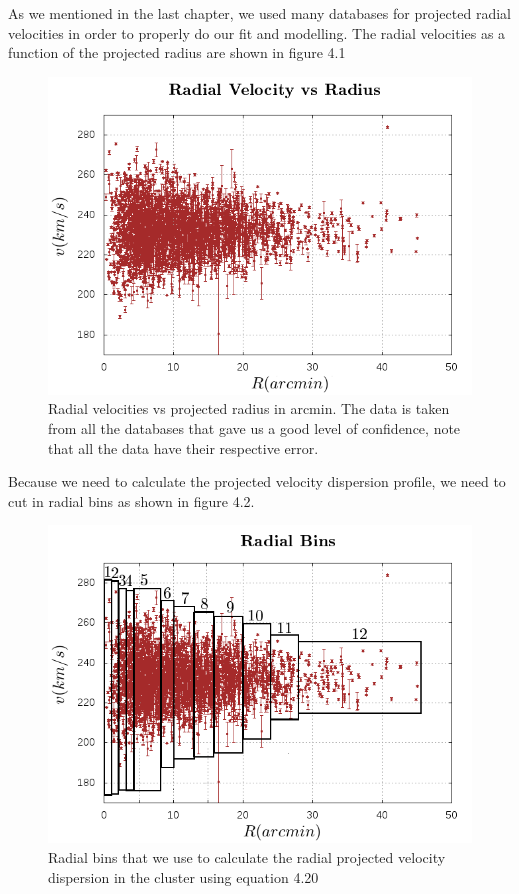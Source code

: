 As we mentioned in the last chapter, we used many databases for projected radial velocities in order to properly do our fit and modelling. The radial velocities as a function of the projected radius are shown in figure 4.1

\begin{figure}[]
\centering
\includegraphics[width=13cm]{images/vel_vs_rad.png}
\caption[Radial velocity database]{Radial velocities vs projected radius in arcmin. The data is taken from all the databases that gave us a good level of confidence, note that all the data have their respective error.}
\end{figure}

Because we need to calculate the projected velocity dispersion profile, we need to cut in radial bins as shown in figure 4.2. 

\begin{figure}[]
\centering
\includegraphics[width=13cm]{images/vel_vs_rad_bins.png}
\caption[Radial bins used to calculate velocity dispersions]{Radial bins that we use to calculate the radial projected velocity dispersion in the cluster using equation 4.20}
\end{figure}

